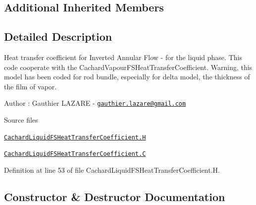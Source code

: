\subsection*{Additional Inherited Members}


\subsection{Detailed Description}
Heat transfer coefficient for Inverted Annular Flow -\/ for the liquid phase. This code cooperate with the Cachard\+Vapour\+F\+S\+Heat\+Transfer\+Coefficient. Warning, this model has been coded for rod bundle, especially for delta model, the thickness of the film of vapor. 

\label{_Description}%
 Author \+: Gauthier L\+A\+Z\+A\+RE -\/ \href{mailto:gauthier.lazare@gmail.com}{\tt gauthier.\+lazare@gmail.\+com}

\begin{DoxyParagraph}{Source files}

\begin{DoxyItemize}
\item \href{../../../home/carlo/data/GeN-Foam/GeN-Foam_ffn/GeN-Foam/GeN-Foam/classes/thermalHydraulics/src/physicsModels/heatTransferModels/FSHeatTransferCoefficientModels/subModels/postCHFModels/CachardLiquid/CachardLiquidFSHeatTransferCoefficient.H}{\tt Cachard\+Liquid\+F\+S\+Heat\+Transfer\+Coefficient.\+H} 
\item \href{../../../home/carlo/data/GeN-Foam/GeN-Foam_ffn/GeN-Foam/GeN-Foam/classes/thermalHydraulics/src/physicsModels/heatTransferModels/FSHeatTransferCoefficientModels/subModels/postCHFModels/CachardLiquid/CachardLiquidFSHeatTransferCoefficient.C}{\tt Cachard\+Liquid\+F\+S\+Heat\+Transfer\+Coefficient.\+C} 
\end{DoxyItemize}
\end{DoxyParagraph}


Definition at line 53 of file Cachard\+Liquid\+F\+S\+Heat\+Transfer\+Coefficient.\+H.



\subsection{Constructor \& Destructor Documentation}
\mbox{\label{classFoam_1_1FSHeatTransferCoefficientModels_1_1CachardLiquid_adc2afa989b907b36a308c4d202dec90a}} 
